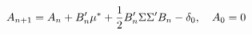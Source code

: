\begin{equation*}
	A_{n + 1} = A_{n} + B_{n}' \mu^{*} + \frac{1}{2} B_{n}' \Sigma \Sigma' B_{n} - \delta_{0} , \quad A_{0} = 0
\end{equation*}